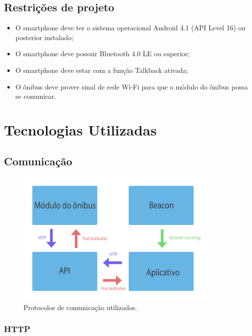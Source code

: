 \documentclass[
	12pt,				%
	oneside,			%
	a4paper,			%
	brazil				%
]{abntex2}
\begin{document}
\section{Restrições de projeto}

\begin{itemize}
\item O smartphone deve ter o sistema operacional Android 4.1 (API Level 16) ou posterior instalado;
\item O smartphone deve possuir Bluetooth 4.0 LE ou superior;
\item O smartphone deve estar com a função Talkback ativada;
\item O ônibus deve prover sinal de rede Wi-Fi para que o módulo do ônibus possa se comunicar.
\end{itemize}

\chapter{Tecnologias Utilizadas}

\section{Comunicação}

\begin{figure}[!h]
\centering
\includegraphics[width=10cm, center]{images/diagram_protocols}
\caption{Protocolos de comunicação utilizados.}
\label{Rotulo}
\end{figure}

\subsection{HTTP}
\end{document}
